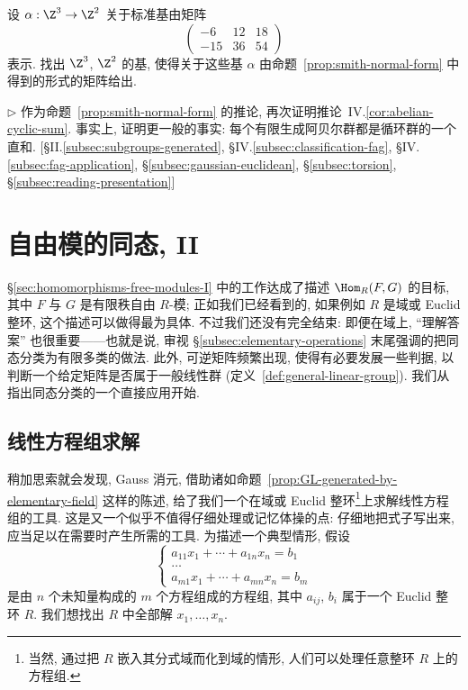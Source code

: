 \begin{prob}
\label{ex:smith-bases-Z3Z2}
设 $\alpha:\Z^3\to\Z^2$ 关于标准基由矩阵
\[
\begin{pmatrix} -6 & 12 & 18\\ -15 & 36 & 54\end{pmatrix}
\]
表示. 找出 $\Z^3$, $\Z^2$ 的基, 使得关于这些基 $\alpha$ 由命题~\ref{prop:smith-normal-form} 中得到的形式的矩阵给出.
\end{prob}

\begin{prob}
\label{ex:smith-finite-abelian}
$\triangleright$ 作为命题~\ref{prop:smith-normal-form} 的推论, 再次证明推论~IV.\ref{cor:abelian-cyclic-sum}. 事实上, 证明更一般的事实: 每个有限生成阿贝尔群都是循环群的一个直和. [§II.\ref{subsec:subgroups-generated}, §IV.\ref{subsec:classification-fag}, §IV.\ref{subsec:fag-application}, §\ref{subsec:gaussian-euclidean}, §\ref{subsec:torsion}, §\ref{subsec:reading-presentation}]
\end{prob}

\section{自由模的同态, II}
\label{sec:hom-free-modules-II}

§\ref{sec:homomorphisms-free-modules-I} 中的工作达成了描述 $\Hom_R(F,G)$ 的目标, 其中 $F$ 与 $G$ 是有限秩自由 $R$-模; 正如我们已经看到的, 如果例如 $R$ 是域或 Euclid 整环, 这个描述可以做得最为具体. 不过我们还没有完全结束: 即便在域上, ``理解答案'' 也很重要——也就是说, 审视 §\ref{subsec:elementary-operations} 末尾强调的把同态分类为有限多类的做法. 此外, 可逆矩阵频繁出现, 使得有必要发展一些判据, 以判断一个给定矩阵是否属于一般线性群 (定义~\ref{def:general-linear-group}). 我们从指出同态分类的一个直接应用开始.

\subsection{线性方程组求解}
\label{subsec:linear-systems}

稍加思索就会发现, Gauss 消元, 借助诸如命题~\ref{prop:GL-generated-by-elementary-field} 这样的陈述, 给了我们一个在域或 Euclid 整环\footnote{当然, 通过把 $R$ 嵌入其分式域而化到域的情形, 人们可以处理任意整环 $R$ 上的方程组.}上求解线性方程组的工具. 这是又一个似乎不值得仔细处理或记忆体操的点: 仔细地把式子写出来, 应当足以在需要时产生所需的工具. 为描述一个典型情形, 假设
\[
\left\{\begin{array}{c}
a_{11}x_1+\cdots+a_{1n}x_n=b_1\\
\dots\\
a_{m1}x_1+\cdots+a_{mn}x_n=b_m
\end{array}\right.
\]
是由 $n$ 个未知量构成的 $m$ 个方程组成的方程组, 其中 $a_{ij}$, $b_i$ 属于一个 Euclid 整环 $R$. 我们想找出 $R$ 中全部解 $x_1,\ldots,x_n$.


